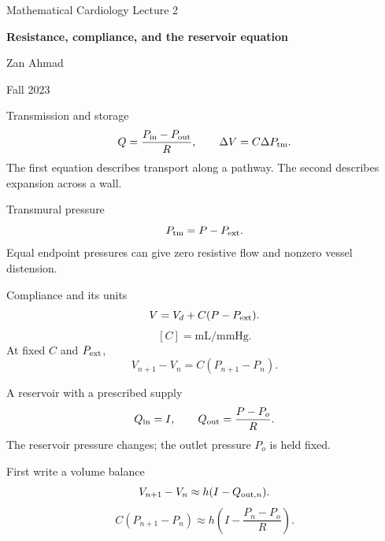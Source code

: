 \documentclass[aspectratio=169,11pt]{beamer}
\newcommand{\notestarget}{notes.pdf}\newcommand{\noteslabel}{Notes}
\begin{document}
\begin{frame}[plain]\vfill
{\small\color{accent} Mathematical Cardiology \quad Lecture 2}\par\medskip
{\raggedright{}\LARGE\bfseries\color{ink} Resistance, compliance, and the reservoir equation}\par\bigskip
Zan Ahmad\par\smallskip
{\small Fall 2023}\par\vfill\end{frame}
\renewcommand{\notestarget}{notes.pdf\#note-two-pressure-differences-and-two-constitutive-laws}
\begin{frame}[t,fragile,label=slide-transmission-and-storage]{Transmission and storage}
\[Q=\frac{P_{\rm in}-P_{\rm out}}R,\qquad \Delta V=C\Delta P_{\rm tm}.\]\pause{} The first equation describes transport along a pathway. The second describes expansion across a wall.
\end{frame}
\renewcommand{\notestarget}{notes.pdf\#note-two-pressure-differences-and-two-constitutive-laws}
\begin{frame}[t,fragile,label=slide-transmural-pressure]{Transmural pressure}
\[P_{\rm tm}=P-P_{\rm ext}.\]\pause{} Equal endpoint pressures can give zero resistive flow and nonzero vessel distension.
\end{frame}
\renewcommand{\notestarget}{notes.pdf\#note-two-pressure-differences-and-two-constitutive-laws}
\begin{frame}[t,fragile,label=slide-compliance-and-its-units]{Compliance and its units}
\[V=V_d+C(P-P_{\rm ext}).\]\pause{}\[[C]=\mathrm{mL/mmHg}.\]\pause{} At fixed $C$ and $P_{\rm ext}$,\[V_{n+1}-V_n=C(P_{n+1}-P_n).\]
\end{frame}
\renewcommand{\notestarget}{notes.pdf\#note-combine-storage-with-a-volume-balance}
\begin{frame}[t,fragile,label=slide-a-reservoir-with-a-prescribed-supply]{A reservoir with a prescribed supply}
\[Q_{\rm in}=I,\qquad Q_{\rm out}=\frac{P-P_o}{R}.\]\pause{} The reservoir pressure changes; the outlet pressure $P_o$ is held fixed.
\end{frame}
\renewcommand{\notestarget}{notes.pdf\#note-combine-storage-with-a-volume-balance}
\begin{frame}[t,fragile,label=slide-first-write-a-volume-balance]{First write a volume balance}
\[V_{n+1}-V_n\approx h(I-Q_{{\rm out},n}).\]\pause{}\[C(P_{n+1}-P_n)\approx h\left(I-\frac{P_n-P_o}{R}\right).\]
\end{frame}
\end{document}
